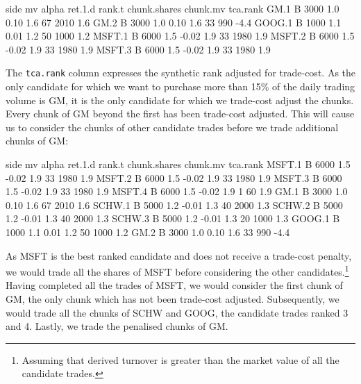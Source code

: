 \documentclass{article}
\begin{document}
\begin{Schunk}
\begin{Soutput}
       side   mv alpha ret.1.d rank.t chunk.shares chunk.mv tca.rank
GM.1      B 3000   1.0    0.10    1.6           67     2010      1.6
GM.2      B 3000   1.0    0.10    1.6           33      990     -4.4
GOOG.1    B 1000   1.1    0.01    1.2           50     1000      1.2
MSFT.1    B 6000   1.5   -0.02    1.9           33     1980      1.9
MSFT.2    B 6000   1.5   -0.02    1.9           33     1980      1.9
MSFT.3    B 6000   1.5   -0.02    1.9           33     1980      1.9
\end{Soutput}
\end{Schunk}

The \texttt{tca.rank} column expresses the synthetic rank adjusted for
trade-cost.  As the only candidate for which we want to purchase more
than 15\% of the daily trading volume is GM, it is the only candidate
for which we trade-cost adjust the chunks.  Every chunk of GM beyond
the first has been trade-cost adjusted.  This will cause us to
consider the chunks of other candidate trades before we trade
additional chunks of GM:

\begin{Schunk}
\begin{Soutput}
       side   mv alpha ret.1.d rank.t chunk.shares chunk.mv tca.rank
MSFT.1    B 6000   1.5   -0.02    1.9           33     1980      1.9
MSFT.2    B 6000   1.5   -0.02    1.9           33     1980      1.9
MSFT.3    B 6000   1.5   -0.02    1.9           33     1980      1.9
MSFT.4    B 6000   1.5   -0.02    1.9            1       60      1.9
GM.1      B 3000   1.0    0.10    1.6           67     2010      1.6
SCHW.1    B 5000   1.2   -0.01    1.3           40     2000      1.3
SCHW.2    B 5000   1.2   -0.01    1.3           40     2000      1.3
SCHW.3    B 5000   1.2   -0.01    1.3           20     1000      1.3
GOOG.1    B 1000   1.1    0.01    1.2           50     1000      1.2
GM.2      B 3000   1.0    0.10    1.6           33      990     -4.4
\end{Soutput}
\end{Schunk}

As MSFT is the best ranked candidate and does not receive a trade-cost
penalty, we would trade all the shares of MSFT before considering the
other candidates.\protect\footnote{Assuming that derived turnover is
greater than the market value of all the candidate trades.}  Having
completed all the trades of MSFT, we would consider the first chunk of
GM, the only chunk which has not been trade-cost adjusted.
Subsequently, we would trade all the chunks of SCHW and GOOG, the
candidate trades ranked 3 and 4.  Lastly, we trade the penalised
chunks of GM.
\end{document}
